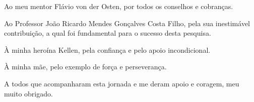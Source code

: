 \documentclass[../thesis.tex]{subfiles}
\begin{document}
\begin{spacing}{1.1}
	Ao meu mentor Flávio von der Osten, por todos os conselhos e cobranças.
	
	Ao Professor João Ricardo Mendes Gonçalves Costa Filho, pela sua inestimável contribuição, a qual foi fundamental para o sucesso desta pesquisa.
	
	À minha heroína Kellen, pela confiança e pelo apoio incondicional.
	
	À minha mãe, pelo exemplo de força e perseverança.
	
	A todos que acompanharam esta jornada e me deram apoio e coragem, meu muito obrigado.
	
	\end{spacing}
	
	\thispagestyle{empty}
\end{document}

